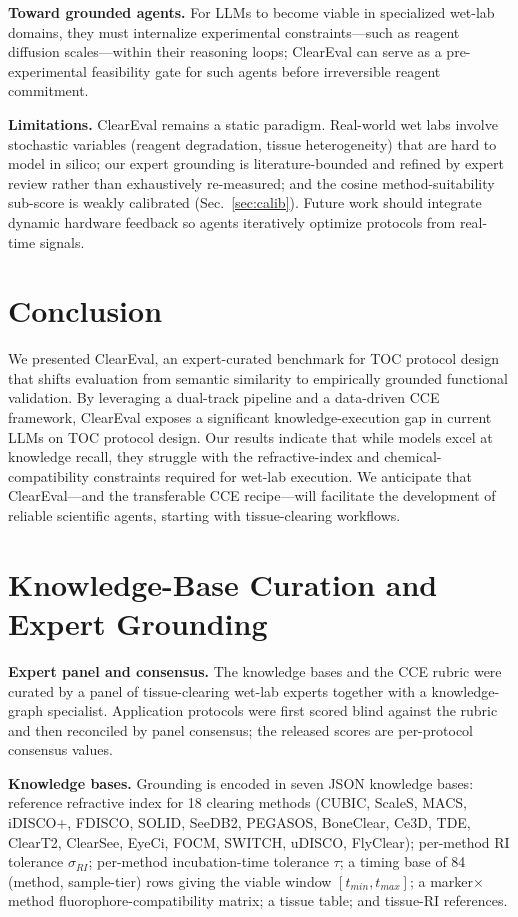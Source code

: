 \documentclass[conference]{IEEEtran}
\begin{document}
\noindent\textbf{Toward grounded agents.} For LLMs to become viable in
specialized wet-lab domains, they must internalize experimental
constraints---such as reagent diffusion scales---within their reasoning loops;
ClearEval can serve as a pre-experimental feasibility gate for such agents
before irreversible reagent commitment.

\noindent\textbf{Limitations.} ClearEval remains a static paradigm. Real-world
wet labs involve stochastic variables (reagent degradation, tissue
heterogeneity) that are hard to model in silico; our expert grounding is
literature-bounded and refined by expert review rather than exhaustively
re-measured; and the cosine method-suitability sub-score is weakly calibrated
(Sec.~\ref{sec:calib}). Future work should integrate dynamic hardware feedback
so agents iteratively optimize protocols from real-time signals.

\section{Conclusion}
We presented ClearEval, an expert-curated benchmark for TOC protocol design
that shifts evaluation from semantic similarity to empirically grounded
functional validation. By leveraging a dual-track pipeline and a data-driven
CCE framework, ClearEval exposes a significant knowledge-execution gap in
current LLMs on TOC protocol design. Our results indicate that while models
excel at knowledge recall, they struggle with the refractive-index and
chemical-compatibility constraints required for wet-lab execution. We anticipate
that ClearEval---and the transferable CCE recipe---will facilitate the
development of reliable scientific agents, starting with tissue-clearing
workflows.

\appendices

\section{Knowledge-Base Curation and Expert Grounding}\label{app:curation}
\noindent\textbf{Expert panel and consensus.} The knowledge bases and the CCE
rubric were curated by a panel of tissue-clearing wet-lab experts together with
a knowledge-graph specialist. Application protocols were first scored blind
against the rubric and then reconciled by panel consensus; the released scores
are per-protocol consensus values.

\noindent\textbf{Knowledge bases.} Grounding is encoded in seven JSON knowledge
bases: reference refractive index for 18 clearing methods (CUBIC, ScaleS, MACS,
iDISCO+, FDISCO, SOLID, SeeDB2, PEGASOS, BoneClear, Ce3D, TDE, ClearT2, ClearSee,
EyeCi, FOCM, SWITCH, uDISCO, FlyClear); per-method RI tolerance $\sigma_{RI}$;
per-method incubation-time tolerance $\tau$; a timing base of 84 (method,
sample-tier) rows giving the viable window $[t_{min}, t_{max}]$; a
marker$\times$method fluorophore-compatibility matrix; a tissue table; and
tissue-RI references.
\end{document}
